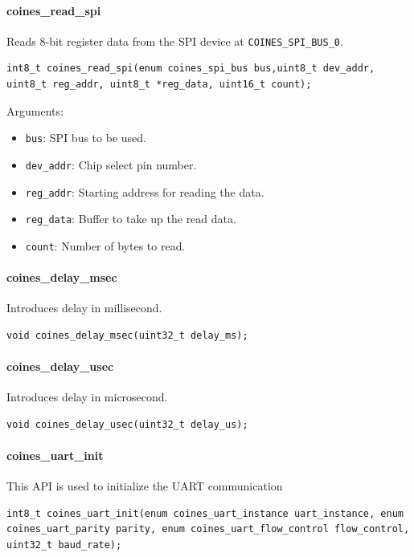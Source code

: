 \paragraph{coines\_read\_spi}\label{CoinesReadSpi}
Reads 8-bit register data from the SPI device at \texttt{COINES\_SPI\_BUS\_0}.

\begin{lstlisting}
int8_t coines_read_spi(enum coines_spi_bus bus,uint8_t dev_addr, uint8_t reg_addr, uint8_t *reg_data, uint16_t count);
\end{lstlisting}

Arguments:
\begin{itemize}
	\item \texttt{bus}: SPI bus to be used.
	\item \texttt{dev\_addr}: Chip select pin number.
	\item \texttt{reg\_addr}: Starting address for reading the data.
	\item \texttt{reg\_data}: Buffer to take up the read data.
	\item \texttt{count}: Number of bytes to read.
\end{itemize}

\paragraph{coines\_delay\_msec}
Introduces delay in millisecond.

\begin{lstlisting}
void coines_delay_msec(uint32_t delay_ms);
\end{lstlisting}

\paragraph{coines\_delay\_usec}
Introduces delay in microsecond.

\begin{lstlisting}
void coines_delay_usec(uint32_t delay_us);
\end{lstlisting}

\paragraph{coines\_uart\_init}
This API is used to initialize the UART communication

\begin{lstlisting}
int8_t coines_uart_init(enum coines_uart_instance uart_instance, enum coines_uart_parity parity, enum coines_uart_flow_control flow_control, uint32_t baud_rate);
\end{lstlisting}

